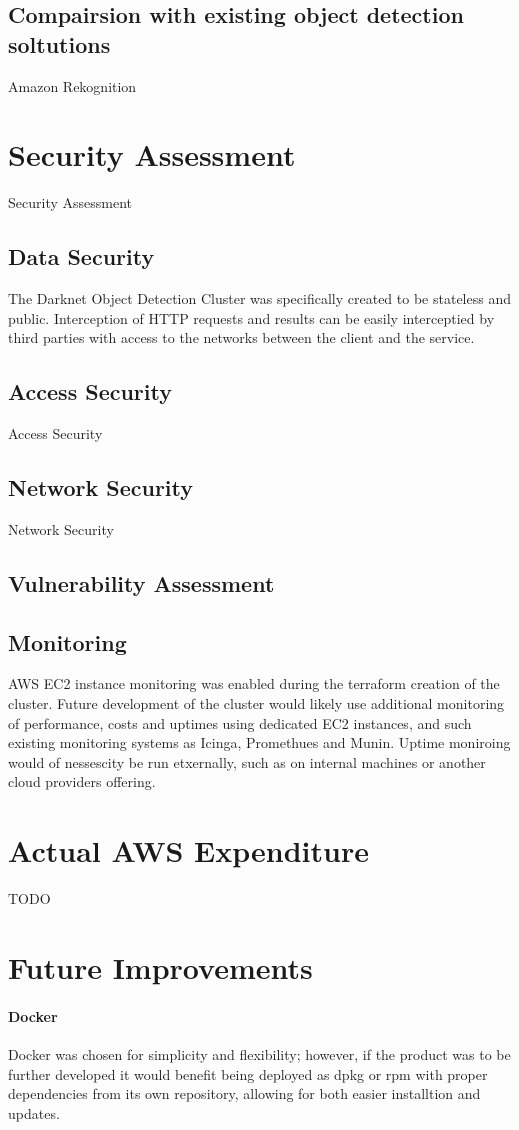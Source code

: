 \documentclass[conference]{IEEEtran}
\begin{document}
\subsection{Compairsion with existing object detection soltutions}
Amazon Rekognition
\section{Security Assessment}
Security Assessment
\subsection{Data Security}
The Darknet Object Detection Cluster was specifically created to be stateless and public. Interception of HTTP requests and results can be easily interceptied by third parties with access to the networks between the client and the service.
\subsection{Access Security}
Access Security
\subsection{Network Security}
Network Security
\subsection{Vulnerability Assessment}
\subsection{Monitoring}
AWS EC2 instance monitoring was enabled during the terraform creation of the cluster. Future development of the cluster would likely use additional monitoring of performance, costs and uptimes using dedicated EC2 instances, and such existing monitoring systems as Icinga, Promethues and Munin. Uptime moniroing would of nessescity be run etxernally, such as on internal machines or another cloud providers offering.
\section{Actual AWS Expenditure}
TODO
\section{Future Improvements}
\paragraph{Docker}
Docker was chosen for simplicity and flexibility; however, if the product was to be further developed it would benefit being deployed as dpkg or rpm with proper dependencies from its own repository, allowing for both easier installtion and updates.
\end{document}
